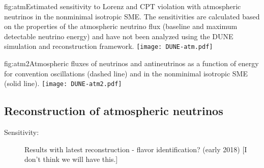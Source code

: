 \begin{dunefigure}{fig:atm}{Estimated sensitivity to Lorenz and CPT violation with atmospheric neutrinos in the nonminimal isotropic SME.  The sensitivities are calculated based on the properties of the atmospheric neutrino flux (baseline and maximum detectable neutrino energy) and have not been analyzed using the DUNE simulation and reconstruction framework.}
\texttt{[image: DUNE-atm.pdf]}
\end{dunefigure}

\begin{dunefigure}{fig:atm2}{Atmospheric fluxes of neutrinos and antineutrinos as a function of energy for convention oscillations (dashed line) and in the nonminimal isotropic SME (solid line).}
\texttt{[image: DUNE-atm2.pdf]}
\end{dunefigure}


\subsection{Reconstruction of atmospheric neutrinos}
\label{sec:nonaccel-atm-reco}

\begin{description}
\item[Sensitivity:] Results with latest reconstruction - flavor identification?  (early 2018) [I don't think we will have this.]
\end{description}
